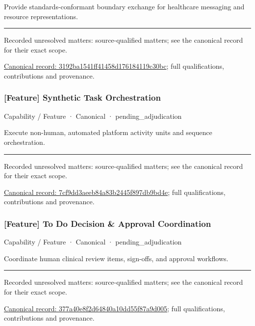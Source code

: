 Provide standards-conformant boundary exchange for healthcare messaging and resource representations.



\medskip\hrule\medskip

{\small Recorded unresolved matters: source-qualified matters; see the canonical record for their exact scope.}\par
{\footnotesize \href{../../../../continuum/strategy/capability/feature/3192ba1541ff41458d176184119c30bc.md}{Canonical record: 3192ba1541ff41458d176184119c30bc}; full qualifications, contributions and provenance.}\par
\subsubsection{[Feature] Synthetic Task Orchestration}

\label{element:7cf9dd3aeeb84a83b2445f897db9bd4e}
{\small Capability / Feature · Canonical · pending\_adjudication}\par

Execute non-human, automated platform activity units and sequence orchestration.



\medskip\hrule\medskip

{\small Recorded unresolved matters: source-qualified matters; see the canonical record for their exact scope.}\par
{\footnotesize \href{../../../../continuum/strategy/capability/feature/7cf9dd3aeeb84a83b2445f897db9bd4e.md}{Canonical record: 7cf9dd3aeeb84a83b2445f897db9bd4e}; full qualifications, contributions and provenance.}\par
\subsubsection{[Feature] To Do Decision \& Approval Coordination}

\label{element:377a40e8f2d64840a10dd55f87a9d005}
{\small Capability / Feature · Canonical · pending\_adjudication}\par

Coordinate human clinical review items, sign-offs, and approval workflows.



\medskip\hrule\medskip

{\small Recorded unresolved matters: source-qualified matters; see the canonical record for their exact scope.}\par
{\footnotesize \href{../../../../continuum/strategy/capability/feature/377a40e8f2d64840a10dd55f87a9d005.md}{Canonical record: 377a40e8f2d64840a10dd55f87a9d005}; full qualifications, contributions and provenance.}\par
